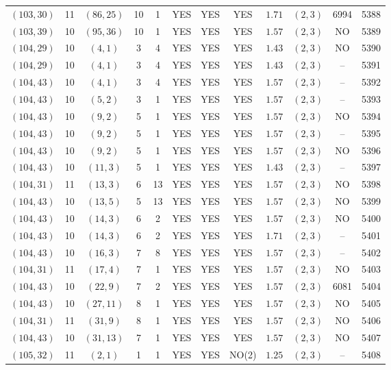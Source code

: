 \begin{longtable}{|c|c|c|c|c|c|c|c|c|c|c|c|}
$(103,30)$ & 11 & $(86,25)$ & 10 & 1 & YES & YES & YES & $1.71$ & $(2,3)$ & 6994 & 5388\\
$(103,39)$ & 10 & $(95,36)$ & 10 & 1 & YES & YES & YES & $1.57$ & $(2,3)$ & NO & 5389\\
$(104,29)$ & 10 & $(4,1)$ & 3 & 4 & YES & YES & YES & $1.43$ & $(2,3)$ & NO & 5390\\
$(104,29)$ & 10 & $(4,1)$ & 3 & 4 & YES & YES & YES & $1.43$ & $(2,3)$ & -- & 5391\\
$(104,43)$ & 10 & $(4,1)$ & 3 & 4 & YES & YES & YES & $1.57$ & $(2,3)$ & -- & 5392\\
$(104,43)$ & 10 & $(5,2)$ & 3 & 1 & YES & YES & YES & $1.57$ & $(2,3)$ & -- & 5393\\
$(104,43)$ & 10 & $(9,2)$ & 5 & 1 & YES & YES & YES & $1.57$ & $(2,3)$ & NO & 5394\\
$(104,43)$ & 10 & $(9,2)$ & 5 & 1 & YES & YES & YES & $1.57$ & $(2,3)$ & -- & 5395\\
$(104,43)$ & 10 & $(9,2)$ & 5 & 1 & YES & YES & YES & $1.57$ & $(2,3)$ & NO & 5396\\
$(104,43)$ & 10 & $(11,3)$ & 5 & 1 & YES & YES & YES & $1.43$ & $(2,3)$ & -- & 5397\\
$(104,31)$ & 11 & $(13,3)$ & 6 & 13 & YES & YES & YES & $1.57$ & $(2,3)$ & NO & 5398\\
$(104,43)$ & 10 & $(13,5)$ & 5 & 13 & YES & YES & YES & $1.57$ & $(2,3)$ & NO & 5399\\
$(104,43)$ & 10 & $(14,3)$ & 6 & 2 & YES & YES & YES & $1.57$ & $(2,3)$ & NO & 5400\\
$(104,43)$ & 10 & $(14,3)$ & 6 & 2 & YES & YES & YES & $1.71$ & $(2,3)$ & -- & 5401\\
$(104,43)$ & 10 & $(16,3)$ & 7 & 8 & YES & YES & YES & $1.57$ & $(2,3)$ & -- & 5402\\
$(104,31)$ & 11 & $(17,4)$ & 7 & 1 & YES & YES & YES & $1.57$ & $(2,3)$ & NO & 5403\\
$(104,43)$ & 10 & $(22,9)$ & 7 & 2 & YES & YES & YES & $1.57$ & $(2,3)$ & 6081 & 5404\\
$(104,43)$ & 10 & $(27,11)$ & 8 & 1 & YES & YES & YES & $1.57$ & $(2,3)$ & NO & 5405\\
$(104,31)$ & 11 & $(31,9)$ & 8 & 1 & YES & YES & YES & $1.57$ & $(2,3)$ & NO & 5406\\
$(104,43)$ & 10 & $(31,13)$ & 7 & 1 & YES & YES & YES & $1.57$ & $(2,3)$ & NO & 5407\\
$(105,32)$ & 11 & $(2,1)$ & 1 & 1 & YES & YES & NO(2) & $1.25$ & $(2,3)$ & -- & 5408\\

\end{longtable}
